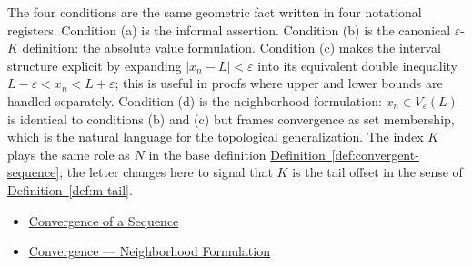 \begin{remark*}[Interpretation]
The four conditions are the same geometric fact written in four
notational registers. Condition (a) is the informal assertion.
Condition (b) is the canonical $\varepsilon$-$K$ definition: the
absolute value formulation. Condition (c) makes the interval
structure explicit by expanding $|x_n - L| < \varepsilon$ into its
equivalent double inequality $L - \varepsilon < x_n < L +
\varepsilon$; this is useful in proofs where upper and lower bounds
are handled separately. Condition (d) is the neighborhood
formulation: $x_n \in V_\varepsilon(L)$ is identical to conditions
(b) and (c) but frames convergence as set membership, which is the
natural language for the topological generalization. The index $K$
plays the same role as $N$ in the base definition
\hyperref[def:convergent-sequence]{Definition~\ref*{def:convergent-sequence}};
the letter changes here to signal that $K$ is the tail offset in
the sense of \hyperref[def:m-tail]{Definition~\ref*{def:m-tail}}.
\end{remark*}

\begin{remark*}[Dependencies]
\begin{itemize}
  \item \hyperref[def:convergent-sequence]{Convergence of a Sequence}
  \item \hyperref[def:convergent-sequence-neighborhood]{Convergence --- Neighborhood Formulation}
\end{itemize}
\end{remark*}





















